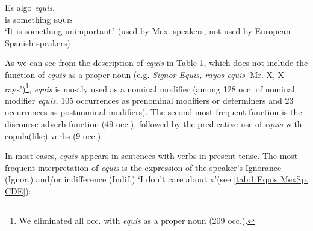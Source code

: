 \documentclass[output=paper
,modfonts
,nonflat]{langsci/langscibook}
\begin{document}
\ea \label{ex:kellert:8}
\gll Es algo \textit{equis}.\\
is something \textsc{equis}\\
\glt ‘It is something unimportant.’
(used by Mex. speakers, not used by European Spanish speakers)
\z

As we can see from the description of \textit{equis} in Table 1, which does not include the function of \textit{equis} as a proper noun (e.g. \textit{Signor Equis, rayos equis} ‘Mr. X, X-rays’)\footnote{We eliminated all occ. with \textit{equis} as a proper noun (209 occ.).}, \textit{equis} is mostly used as a nominal modifier (among 128 occ. of nominal modifier \textit{equis}, 105 occurrences as prenominal modifiers or determiners and 23 occurrences as postnominal modifiers). The second most frequent function is the discourse adverb function (49 occ.), followed by the predicative use of \textit{equis} with copula(like) verbs (9 occ.).

In most cases, \textit{equis} appears in sentences with verbs in present tense. The most frequent interpretation of \textit{equis} is the expression of the speaker’s Ignorance (Ignor.) and/or indifference (Indif.) ‘I don’t care about x’(see \ref{tab:1:Equis MexSp. CDE}):
\end{document}
